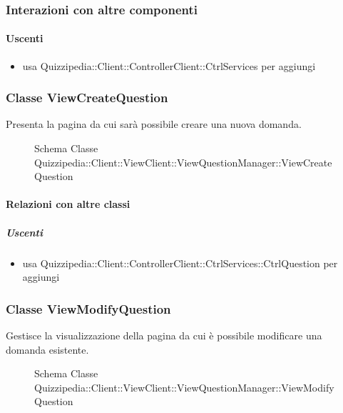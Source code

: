 \subsubsection{Interazioni con altre componenti}
\paragraph{Uscenti}
\begin{itemize}
\item usa Quizzipedia::Client::ControllerClient::CtrlServices per aggiungi
\end{itemize}
\subsubsection{Classe ViewCreateQuestion}
Presenta la pagina da cui sarà possibile creare una nuova domanda.
\begin{figure}[H]
\centering
\noindent{}
\caption[Schema Classe ViewCreateQuestion]{Schema Classe Quizzipedia::Client::ViewClient::ViewQuestionManager::ViewCreateQuestion}
\end{figure}
\paragraph{Relazioni con altre classi}
\subparagraph{Uscenti}
\begin{itemize}
\item usa Quizzipedia::Client::ControllerClient::CtrlServices::CtrlQuestion per aggiungi
\end{itemize}
\subsubsection{Classe ViewModifyQuestion}
Gestisce la visualizzazione della pagina da cui è possibile modificare una domanda esistente.
\begin{figure}[H]
\centering
\noindent{}
\caption[Schema Classe ViewModifyQuestion]{Schema Classe Quizzipedia::Client::ViewClient::ViewQuestionManager::ViewModifyQuestion}
\end{figure}
